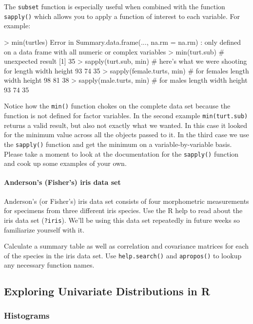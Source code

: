 The \lstinline!subset! function is especially useful when combined with
the function \lstinline!sapply()! which allows you to apply a function
of interest to each variable. For example:
%
\begin{R}
> min(turtles)
Error in Summary.data.frame(..., na.rm = na.rm) : 
        only defined on a data frame with all numeric or complex variables
> min(turt.sub)  # unexpected result
[1] 35
> sapply(turt.sub, min) # here's what we were shooting for
length  width height 
    93     74     35
> sapply(female.turts, min) # for females
length  width height 
    98     81     38 
> sapply(male.turts, min) # for males
length  width height 
    93     74     35      
\end{R}
%
Notice how the \lstinline!min()! function chokes on the complete data
set because the function is not defined for factor variables. In the
second example \lstinline!min(turt.sub)! returns a valid result, but
also not exactly what we wanted. In this case it looked for the minimum
value across all the objects passed to it. In the third case we use the
\lstinline!sapply()! function and get the minimum on a
variable-by-variable basis. Please take a moment to look at the
documentation for the \lstinline!sapply()! function and cook up some
examples of your own.

\paragraph{Anderson's (Fisher's) iris data set}

Anderson's (or Fisher's) iris data set consists of four morphometric
measurements for specimens from three different iris species. Use the R
help to read about the iris data set (\lstinline!?iris!). We'll be using
this data set repeatedly in future weeks so familiarize yourself with
it.

\smallskip
\begin{assignment}
Calculate a summary table as well as correlation
and covariance matrices for each of the species in the iris data set.
Use \lstinline!help.search()! and \lstinline!apropos()! to lookup any
necessary function names.
\end{assignment}


\subsection{Exploring Univariate Distributions in R}

\subsubsection{Histograms}


